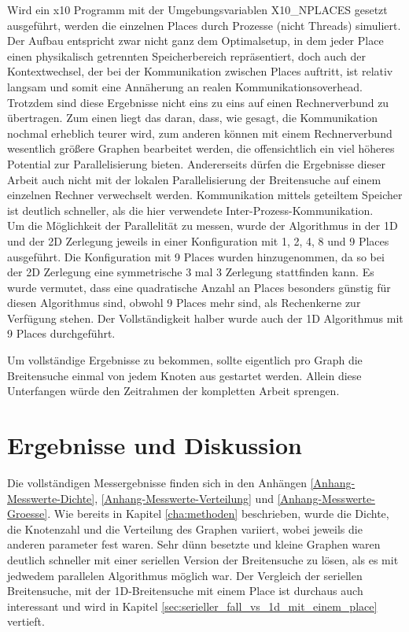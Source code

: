 Wird ein x10 Programm mit der Umgebungsvariablen X10\_NPLACES gesetzt ausgeführt, werden die einzelnen Places durch Prozesse (nicht Threads) simuliert. Der Aufbau entspricht zwar nicht ganz dem Optimalsetup, in dem jeder Place einen physikalisch getrennten Speicherbereich repräsentiert, doch auch der Kontextwechsel, der bei der Kommunikation zwischen Places auftritt, ist relativ langsam und somit eine Annäherung an realen Kommunikationsoverhead. Trotzdem sind diese Ergebnisse nicht eins zu eins auf einen Rechnerverbund zu übertragen. Zum einen liegt das daran, dass, wie gesagt, die Kommunikation nochmal erheblich teurer wird, zum anderen können mit einem Rechnerverbund wesentlich größere Graphen bearbeitet werden, die offensichtlich ein viel höheres Potential zur Parallelisierung bieten. Andererseits dürfen die Ergebnisse dieser Arbeit auch nicht mit der lokalen Parallelisierung der Breitensuche auf einem einzelnen Rechner verwechselt werden. Kommunikation mittels geteiltem Speicher ist deutlich schneller, als die hier verwendete Inter-Prozess-Kommunikation. \\
Um die Möglichkeit der Parallelität zu messen, wurde der Algorithmus in der 1D und der 2D Zerlegung jeweils in einer Konfiguration mit 1, 2, 4, 8 und 9 Places ausgeführt. Die Konfiguration mit 9 Places wurden hinzugenommen, da so bei der 2D Zerlegung eine symmetrische 3 mal 3 Zerlegung stattfinden kann. Es wurde vermutet, dass eine quadratische Anzahl an Places besonders günstig für diesen Algorithmus sind, obwohl 9 Places mehr sind, als Rechenkerne zur Verfügung stehen. Der Vollständigkeit halber wurde auch der 1D Algorithmus mit 9 Places durchgeführt.

Um vollständige Ergebnisse zu bekommen, sollte eigentlich pro Graph die Breitensuche einmal von jedem Knoten aus gestartet werden. Allein diese Unterfangen würde den Zeitrahmen der kompletten Arbeit sprengen.     

\chapter{Ergebnisse und Diskussion} %
\label{cha:ergebnisse_und_diskussion}

Die vollständigen Messergebnisse finden sich in den Anhängen \ref{Anhang-Messwerte-Dichte}, \ref{Anhang-Messwerte-Verteilung} und \ref{Anhang-Messwerte-Groesse}. Wie bereits in Kapitel \ref{cha:methoden} beschrieben, wurde die Dichte, die Knotenzahl und die Verteilung des Graphen variiert, wobei jeweils die anderen parameter fest waren. Sehr dünn besetzte und kleine Graphen waren deutlich schneller mit einer seriellen Version der Breitensuche zu lösen, als es mit jedwedem parallelen Algorithmus möglich war. Der Vergleich der seriellen Breitensuche, mit der 1D-Breitensuche mit einem Place ist durchaus auch interessant und wird in Kapitel \ref{sec:serieller_fall_vs_1d_mit_einem_place} vertieft.

